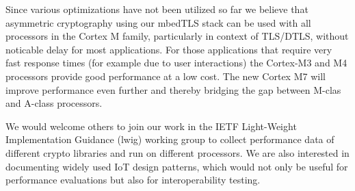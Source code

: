 \documentclass[peerreview, a4paper, draft, 7pt]{IEEEtran}
\begin{document}
Since various optimizations have not been utilized so far we believe that asymmetric cryptography using our mbedTLS stack can be used with all processors in the Cortex M family, particularly in context of TLS/DTLS, without noticable delay for most applications. For those applications that require very fast response times (for example due to user interactions) the Cortex-M3 and M4 processors provide good performance at a low cost. The new Cortex M7 will improve performance even further and thereby bridging the gap between M-clas and A-class processors. 

We would welcome others to join our work in the IETF Light-Weight Implementation Guidance (lwig) working group to collect performance data of different crypto libraries and run on different processors. We are also interested in documenting widely used IoT design patterns, which would not only be useful for performance evaluations but also for interoperability testing.

% 

\end{document}
